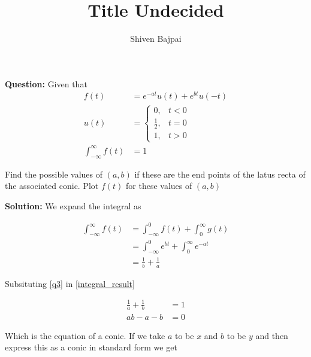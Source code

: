 \documentclass[journal]{IEEEtran}
\begin{document}
\onecolumn

\vspace{3cm}

\renewcommand{\thefigure}{\theenumi}
\renewcommand{\thetable}{\theenumi}

\title{Title Undecided}
\author{Shiven Bajpai}
\maketitle

\renewcommand{\thefigure}{\theenumi}
\renewcommand{\thetable}{\theenumi} 

\textbf{Question: } Given that
\begin{align}
	f(t) &= e^{-at}u(t) + e^{bt}u(-t) \label{q1}\\
	u(t) &= \begin{cases}
		0, & t<0\\
		\frac{1}{2}, & t=0 \\
		1, & t>0
	\end{cases} \label{q2}\\
	\int_{-\infty}^{\infty} f(t) &= 1 \label{q3}
\end{align}

Find the possible values of $(a,b)$ if these are the end points of the latus recta of the associated conic. Plot $f(t)$ for these values of $(a,b)$

\bigskip

\textbf{Solution: } We expand the integral as 

\begin{align}
	\int_{-\infty}^{\infty} f(t) &= \int_{-\infty}^{0} f(t) + \int_{0}^{\infty} g(t)\\
	&= \int_{-\infty}^{0} e^{bt} + \int_{0}^{\infty} e^{-at}\\
	&= \frac{1}{b} + \frac{1}{a} \label{integral_result}
\end{align}

Subsituting \eqref{q3} in \eqref{integral_result}

\begin{align}
	\frac{1}{a} + \frac{1}{b} &= 1\\
	ab - a - b &= 0 \label{conic_ab}
\end{align}

Which is the equation of a conic. 
If we take $a$ to be $x$ and $b$ to be $y$ and then express this as a conic in standard form we get
\end{document}
